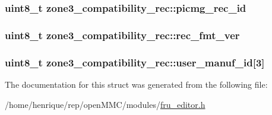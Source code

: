 \hypertarget{structzone3__compatibility__rec_a507f100167e2a5ad0d33537adbdaee58}{
\subsubsection[{picmg\-\_\-rec\-\_\-id}]{\setlength{\rightskip}{0pt plus 5cm}uint8\-\_\-t zone3\-\_\-compatibility\-\_\-rec\-::picmg\-\_\-rec\-\_\-id}}\label{structzone3__compatibility__rec_a507f100167e2a5ad0d33537adbdaee58}
\hypertarget{structzone3__compatibility__rec_a693f5e02220a509d5d42e757503e16c2}{
\subsubsection[{rec\-\_\-fmt\-\_\-ver}]{\setlength{\rightskip}{0pt plus 5cm}uint8\-\_\-t zone3\-\_\-compatibility\-\_\-rec\-::rec\-\_\-fmt\-\_\-ver}}\label{structzone3__compatibility__rec_a693f5e02220a509d5d42e757503e16c2}
\hypertarget{structzone3__compatibility__rec_ac98e85b56d97ff872f52f8c9c37f60e2}{
\subsubsection[{user\-\_\-manuf\-\_\-id}]{\setlength{\rightskip}{0pt plus 5cm}uint8\-\_\-t zone3\-\_\-compatibility\-\_\-rec\-::user\-\_\-manuf\-\_\-id\mbox{[}3\mbox{]}}}\label{structzone3__compatibility__rec_ac98e85b56d97ff872f52f8c9c37f60e2}


The documentation for this struct was generated from the following file\-:\begin{DoxyCompactItemize}
\item 
/home/henrique/rep/open\-M\-M\-C/modules/\hyperlink{fru__editor_8h}{fru\-\_\-editor.\-h}\end{DoxyCompactItemize}
